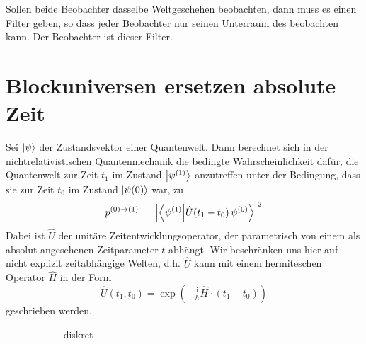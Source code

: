\documentclass[12pt]{article}
\begin{document}
Sollen beide Beobachter dasselbe Weltgeschehen beobachten, dann muss es einen Filter geben, so dass jeder Beobachter nur seinen Unterraum des beobachten kann. Der Beobachter ist dieser Filter.

\section{Blockuniversen ersetzen absolute Zeit}
Sei $\ket{\psi}$ der Zustandsvektor einer Quantenwelt. Dann berechnet sich in der nichtrelativistischen Quantenmechanik die bedingte Wahrscheinlichkeit dafür, die Quantenwelt zur Zeit $t_1$ im Zustand $\ket{\psi^{(1)}}$ anzutreffen unter der Bedingung, dass sie zur Zeit $t_0$ im Zustand  $\ket{\psi{(0)}}$ war, zu
\begin{equation} 
\label{eq:conditional_probability}
p^{(0)\rightarrow(1)} =\ \Bigl| \bra{\psi^{(1)}}\ket{\hat{U}(t_1-t_0)\,\psi^{(0)}} \Bigr|^2
\end{equation}
Dabei ist $\hat{U}$ der unitäre Zeitentwicklungsoperator, der parametrisch von einem als absolut angesehenen Zeitparameter $t$ abhängt. Wir beschränken uns hier auf nicht explizit zeitabhängige Welten, d.h. $\hat{U}$ kann mit einem hermiteschen Operator $\hat{H}$ in der Form
\begin{equation}
\label{eq:time_evolution}
\hat{U}(t_1,t_0)=\exp \left(-\tfrac {\mathrm {i} }{\hbar}\hat{H}\cdot (t_1-t_0)\right)
\end{equation}
geschrieben werden. 


-----------------
diskret
\end{document}
